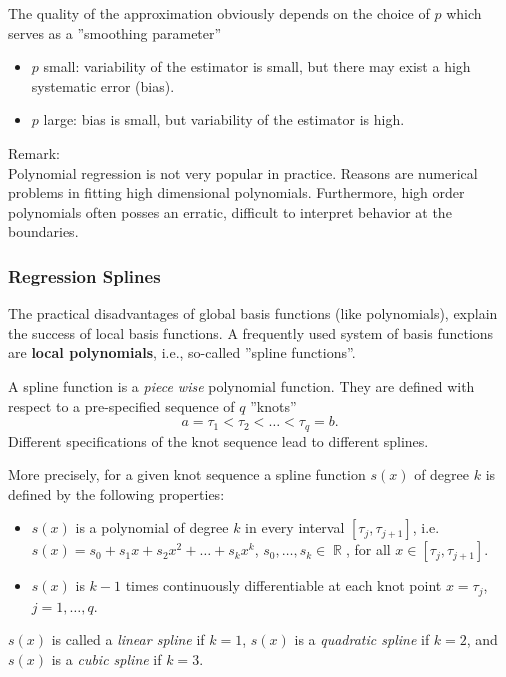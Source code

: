 \documentclass[14pt]{extreport}\usepackage[]{graphicx}\usepackage[]{xcolor}
\DeclareMathOperator{\R}{\mathbb{R}}
\begin{document}
The quality of the approximation obviously depends on the choice of $p$ which serves as a ''smoothing parameter''


\begin{itemize}
\item $p$ small: variability of the estimator is small, but there may exist a high systematic error (bias).
\item $p$ large: bias is small, but variability of the estimator is high.
\end{itemize}


Remark:\\
Polynomial regression is not very popular in practice. Reasons are numerical problems in fitting high dimensional
polynomials. Furthermore, high order polynomials often posses
an erratic, difficult to interpret behavior at the boundaries.

\newpage

\subsubsection{Regression Splines}

The practical disadvantages of global basis functions (like polynomials), explain the success of local basis functions. A frequently used system of basis functions are {\bf local polynomials}, i.e., so-called ''spline functions''.  

\bigskip


A spline function is a {\em piece wise } polynomial function. They are defined with respect
to a pre-specified sequence of $q$ ''knots'' 
$$
a= \tau_1<\tau_2<\dots<\tau_q= b.
$$ 
Different specifications of the knot sequence lead to different splines.

\bigskip

More precisely, for a given knot sequence a spline function $s(x)$ of degree $k$ is defined by the following properties:
\begin{itemize}
\item $s(x)$ is a polynomial of degree $k$ in every interval $[\tau_j,\tau_{j+1}]$, i.e.
$s(x)=s_0+s_1x+s_2x^2+\dots+s_kx^{k}$, $s_0,\dots,s_k\in\R$, for all $x\in[\tau_j,\tau_{j+1}]$.
\item $s(x)$ is  $k-1$ times continuously differentiable at each knot point $x=\tau_j$, $j=1,\dots,q$.
\end{itemize}

$s(x)$ is called a \emph{linear spline} if $k=1$, $s(x)$ is a \emph{quadratic spline} if $k=2$, and
$s(x)$ is a \emph{cubic spline}  if $k=3$.
\end{document}
